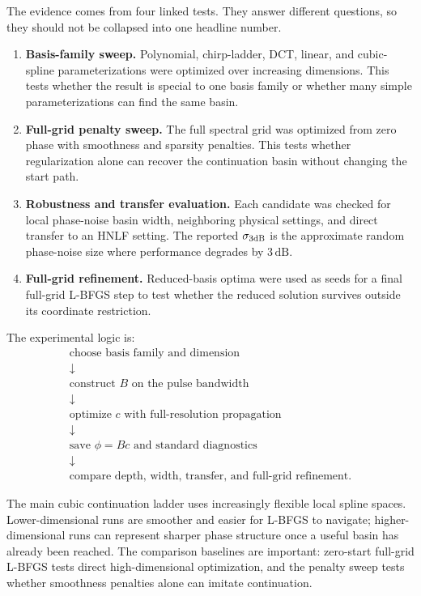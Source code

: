 \documentclass[11pt]{article}
\begin{document}
The evidence comes from four linked tests. They answer different questions, so
they should not be collapsed into one headline number.

\begin{enumerate}
    \item \textbf{Basis-family sweep.} Polynomial, chirp-ladder, DCT, linear,
    and cubic-spline parameterizations were optimized over increasing
    dimensions. This tests whether the result is special to one basis family or
    whether many simple parameterizations can find the same basin.
    \item \textbf{Full-grid penalty sweep.} The full spectral grid was optimized
    from zero phase with smoothness and sparsity penalties. This tests whether
    regularization alone can recover the continuation basin without changing
    the start path.
    \item \textbf{Robustness and transfer evaluation.} Each candidate was
    checked for local phase-noise basin width, neighboring physical settings,
    and direct transfer to an HNLF setting. The reported
    \(\sigma_{3\mathrm{dB}}\) is the approximate random phase-noise size where
    performance degrades by \(3\,\mathrm{dB}\).
    \item \textbf{Full-grid refinement.} Reduced-basis optima were used as seeds
    for a final full-grid L-BFGS step to test whether the reduced solution
    survives outside its coordinate restriction.
\end{enumerate}

The experimental logic is:
\[
\begin{array}{c}
\text{choose basis family and dimension}\\
\downarrow\\
\text{construct }B\text{ on the pulse bandwidth}\\
\downarrow\\
\text{optimize }c\text{ with full-resolution propagation}\\
\downarrow\\
\text{save }\phi=Bc\text{ and standard diagnostics}\\
\downarrow\\
\text{compare depth, width, transfer, and full-grid refinement.}
\end{array}
\]

The main cubic continuation ladder uses increasingly flexible local spline
spaces. Lower-dimensional runs are smoother and easier for L-BFGS to navigate;
higher-dimensional runs can represent sharper phase structure once a useful
basin has already been reached. The comparison baselines are important:
zero-start full-grid L-BFGS tests direct high-dimensional optimization, and the
penalty sweep tests whether smoothness penalties alone can imitate
continuation.
\end{document}
